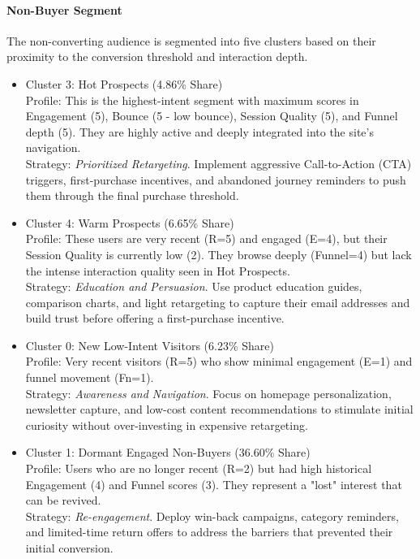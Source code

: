 \documentclass[conference]{IEEEtran}
\begin{document}
\paragraph{Non-Buyer Segment}

The non-converting audience is segmented into five clusters based on their proximity to the conversion threshold and interaction depth.

\begin{itemize}
    \item Cluster 3: Hot Prospects (4.86\% Share) \\
    Profile: This is the highest-intent segment with maximum scores in Engagement (5), Bounce (5 - low bounce), Session Quality (5), and Funnel depth (5). They are highly active and deeply integrated into the site's navigation. \\
    Strategy: \textit{Prioritized Retargeting}. Implement aggressive Call-to-Action (CTA) triggers, first-purchase incentives, and abandoned journey reminders to push them through the final purchase threshold.
    
    \item Cluster 4: Warm Prospects (6.65\% Share) \\
    Profile: These users are very recent (R=5) and engaged (E=4), but their Session Quality is currently low (2). They browse deeply (Funnel=4) but lack the intense interaction quality seen in Hot Prospects. \\
    Strategy: \textit{Education and Persuasion}. Use product education guides, comparison charts, and light retargeting to capture their email addresses and build trust before offering a first-purchase incentive.

    \item Cluster 0: New Low-Intent Visitors (6.23\% Share) \\
    Profile: Very recent visitors (R=5) who show minimal engagement (E=1) and funnel movement (Fn=1). \\
    Strategy: \textit{Awareness and Navigation}. Focus on homepage personalization, newsletter capture, and low-cost content recommendations to stimulate initial curiosity without over-investing in expensive retargeting.

    \item Cluster 1: Dormant Engaged Non-Buyers (36.60\% Share) \\
    Profile: Users who are no longer recent (R=2) but had high historical Engagement (4) and Funnel scores (3). They represent a "lost" interest that can be revived. \\
    Strategy: \textit{Re-engagement}. Deploy win-back campaigns, category reminders, and limited-time return offers to address the barriers that prevented their initial conversion.


\end{itemize}
\end{document}
